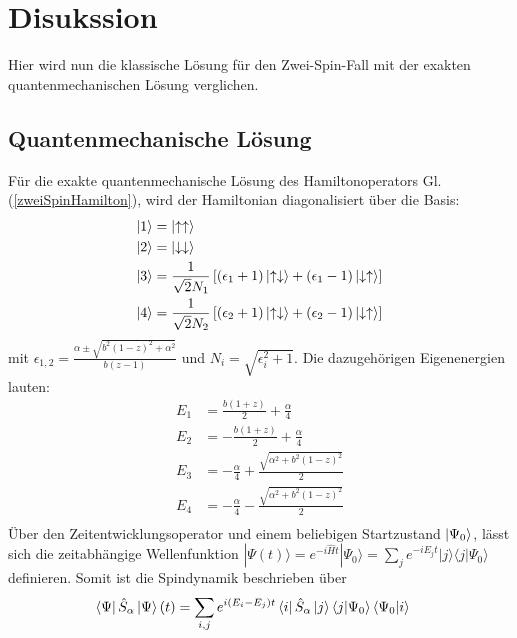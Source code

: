 \chapter{Disukssion}
Hier wird nun die klassische Lösung für den Zwei-Spin-Fall mit der exakten quantenmechanischen Lösung verglichen.
\section{Quantenmechanische Lösung}
Für die exakte quantenmechanische Lösung des Hamiltonoperators Gl. (\ref{zweiSpinHamilton}), wird der Hamiltonian diagonalisiert über die Basis:
\begin{align}
    \ket{1} &= \ket{\uparrow\uparrow}   \\
    \ket{2} &= \ket{\downarrow\downarrow} \\
    \ket{3} &= \frac{1}{\sqrt{2}N_1}\left[(\epsilon_1+1)\ket{\uparrow\downarrow} +(\epsilon_1-1)\ket{\downarrow\uparrow} \right]\\
    \ket{4} &= \frac{1}{\sqrt{2}N_2}\left[(\epsilon_2+1)\ket{\uparrow\downarrow} +(\epsilon_2-1)\ket{\downarrow\uparrow} \right]
\end{align}
mit $\epsilon_{1,2} = \frac{\alpha \pm \sqrt{b^2(1-z)^2+\alpha^2} }{b(z-1)} $ und $N_{i} = \sqrt{\epsilon_i^2 + 1}$. Die dazugehörigen Eigenenergien lauten:
\begin{align}
    E_1 &= \frac{b(1+z)}{2} + \frac{\alpha}{4}\\
    E_2 &= -\frac{b(1+z)}{2} + \frac{\alpha}{4}\\
    E_3 &= -\frac{\alpha}{4} + \frac{\sqrt{\alpha^2 + b^2(1-z)^2}}{2}\\
    E_4 &= -\frac{\alpha}{4} - \frac{\sqrt{\alpha^2 + b^2(1-z)^2}}{2}\\
\end{align}
\noindent Über den Zeitentwicklungsoperator und einem beliebigen Startzustand $\ket{\Psi_0}$, lässt sich die zeitabhängige Wellenfunktion 
$|\Psi(t)\rangle = e^{-i\hat{H}t}|\Psi_0\rangle = \sum_j e^{-i E_j t}|j\rangle\langle j|\Psi_0\rangle$ definieren. Somit ist die Spindynamik
beschrieben über
\begin{align}
    \bra{\Psi}\hat{S}_\alpha\ket{\Psi}(t) &= \sum_{i,j}e^{i(E_i-E_j)t}\bra{i}\hat{S}_\alpha\ket{j}\bra{j}\ket{\Psi_0}\bra{\Psi_0}\ket{i}
\end{align}
